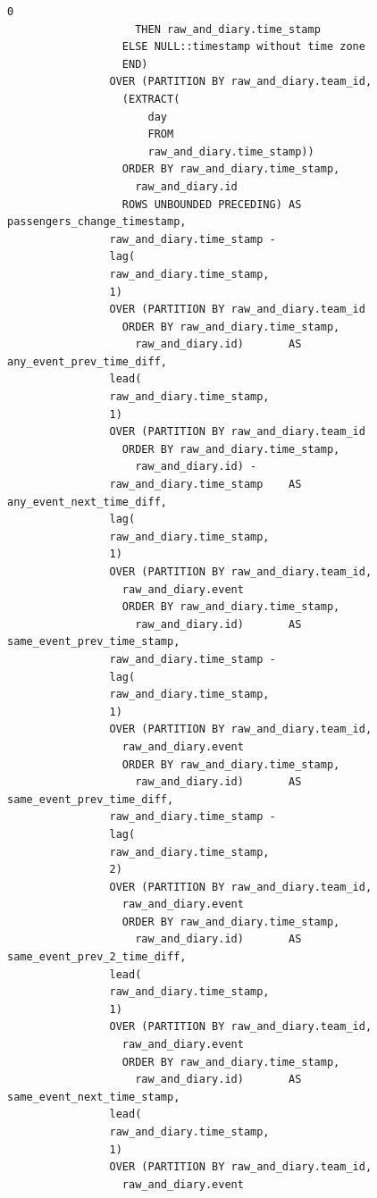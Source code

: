\documentclass[11pt]{article}
\begin{document}
\begin{lstlisting}[style=sql, caption={Full Audit query}, label={lst:sql_audit_query}]
                      0
                    THEN raw_and_diary.time_stamp
                  ELSE NULL::timestamp without time zone
                  END)
                OVER (PARTITION BY raw_and_diary.team_id,
                  (EXTRACT(
                      day
                      FROM
                      raw_and_diary.time_stamp))
                  ORDER BY raw_and_diary.time_stamp,
                    raw_and_diary.id
                  ROWS UNBOUNDED PRECEDING) AS passengers_change_timestamp,
                raw_and_diary.time_stamp -
                lag(
                raw_and_diary.time_stamp,
                1)
                OVER (PARTITION BY raw_and_diary.team_id
                  ORDER BY raw_and_diary.time_stamp,
                    raw_and_diary.id)       AS any_event_prev_time_diff,
                lead(
                raw_and_diary.time_stamp,
                1)
                OVER (PARTITION BY raw_and_diary.team_id
                  ORDER BY raw_and_diary.time_stamp,
                    raw_and_diary.id) -
                raw_and_diary.time_stamp    AS any_event_next_time_diff,
                lag(
                raw_and_diary.time_stamp,
                1)
                OVER (PARTITION BY raw_and_diary.team_id,
                  raw_and_diary.event
                  ORDER BY raw_and_diary.time_stamp,
                    raw_and_diary.id)       AS same_event_prev_time_stamp,
                raw_and_diary.time_stamp -
                lag(
                raw_and_diary.time_stamp,
                1)
                OVER (PARTITION BY raw_and_diary.team_id,
                  raw_and_diary.event
                  ORDER BY raw_and_diary.time_stamp,
                    raw_and_diary.id)       AS same_event_prev_time_diff,
                raw_and_diary.time_stamp -
                lag(
                raw_and_diary.time_stamp,
                2)
                OVER (PARTITION BY raw_and_diary.team_id,
                  raw_and_diary.event
                  ORDER BY raw_and_diary.time_stamp,
                    raw_and_diary.id)       AS same_event_prev_2_time_diff,
                lead(
                raw_and_diary.time_stamp,
                1)
                OVER (PARTITION BY raw_and_diary.team_id,
                  raw_and_diary.event
                  ORDER BY raw_and_diary.time_stamp,
                    raw_and_diary.id)       AS same_event_next_time_stamp,
                lead(
                raw_and_diary.time_stamp,
                1)
                OVER (PARTITION BY raw_and_diary.team_id,
                  raw_and_diary.event

\end{lstlisting}
\end{document}
